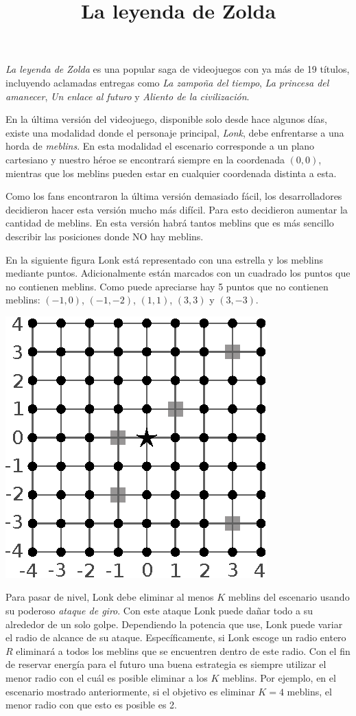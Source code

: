 \documentclass{oci}
\title{La leyenda de Zolda}
\begin{document}
\begin{problemDescription}
  \emph{La leyenda de Zolda} es una popular saga de videojuegos con ya más de 19
  títulos, incluyendo aclamadas entregas como \emph{La zampoña del tiempo},
  \emph{La princesa del amanecer}, \emph{Un enlace al futuro} y \emph{Aliento de
  la civilización}.

  En la última versión del videojuego, disponible solo desde hace algunos días,
  existe una modalidad donde el personaje principal, \emph{Lonk}, debe
  enfrentarse a una horda de \emph{meblins}.
  En esta modalidad el escenario corresponde a un plano cartesiano y nuestro
  héroe se encontrará siempre en la coordenada $(0,0)$, mientras que los meblins
  pueden estar en cualquier coordenada distinta a esta.

  Como los fans encontraron la última versión demasiado fácil, los
  desarrolladores decidieron hacer esta versión mucho más difícil.
  Para esto decidieron aumentar la cantidad de meblins.
  En esta versión habrá tantos meblins que es más sencillo describir las
  posiciones donde NO hay meblins.

  En la siguiente figura Lonk está representado con una estrella y los meblins
  mediante puntos.
  Adicionalmente están marcados con un cuadrado los puntos que no contienen meblins.
  Como puede apreciarse hay 5 puntos que no contienen meblins: $(-1,0)$, $(-1,-2)$,
  $(1,1)$, $(3,3)$ y $(3, -3)$.
  \begin{center}
  \includegraphics{zolda}
  \end{center}
  Para pasar de nivel, Lonk debe eliminar al menos $K$ meblins del escenario
  usando su poderoso \emph{ataque de giro}.
  Con este ataque Lonk puede dañar todo a su alrededor de un solo golpe.
  Dependiendo la potencia que use, Lonk puede variar el radio de alcance de su
  ataque.
  Específicamente, si Lonk escoge un radio entero $R$ eliminará a todos los
  meblins que se encuentren dentro de este radio.
  Con el fin de reservar energía para el futuro una buena estrategia es siempre
  utilizar el menor radio con el cuál es posible eliminar a los $K$ meblins.
  Por ejemplo, en el escenario mostrado anteriormente, si el objetivo es eliminar
  $K=4$ meblins, el menor radio con que esto es posible es 2.


\end{problemDescription}
\end{document}
